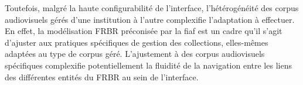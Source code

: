%			


Toutefois, malgré la haute configurabilité de l’interface, l’hétérogénéité des corpus audiovisuels gérés d’une institution à l’autre complexifie l'adaptation à effectuer. En effet, la modélisation \gls{FRBR} préconisée par la \gls{fiaf} est un cadre qu’il s’agit d’ajuster aux pratiques spécifiques de gestion des collections, elles-mêmes adaptées au type de corpus géré. L’ajustement à des corpus audiovisuels spécifiques complexifie potentiellement la fluidité de la navigation entre les liens des différentes entités du \gls{FRBR} au sein de l’interface.   











